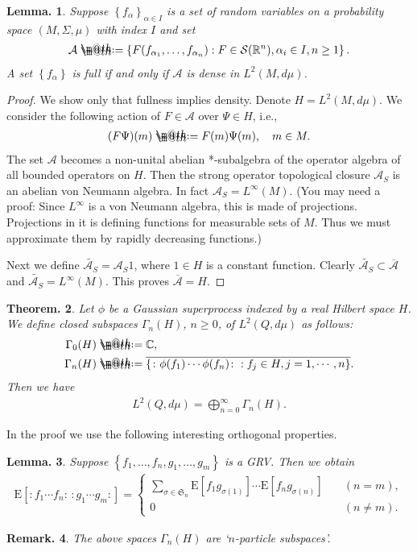 \documentclass[openany, a4paper, oneside]{book}
\makeatletter
\newcommand*{\defeq}{\mathrel{\rlap{%
\raisebox{0.3ex}{$\m@th\cdot$}}%
\raisebox{-0.3ex}{$\m@th\cdot$}}%
=}
\theoremstyle{break}
\newtheorem{thm}{Theorem.}[section]
\newtheorem{lem}[thm]{Lemma.}
\theoremstyle{breakdefn}
\newtheorem{rem}[thm]{Remark.}
\newcommand{\rbk}[1]{\left (#1\right)}
\newcommand{\sqbk}[1]{\left[#1\right]}
\newcommand{\cbk}[1]{\left\{#1\right\}}
\newcommand{\set}[2]{\left\{#1 : #2\right\}}
\newcommand{\bbC}{\mathbb{C}}
\newcommand{\bbR}{\mathbb{R}}
\newcommand{\calA}{\mathcal{A}}
\newcommand{\calS}{\mathcal{S}}
\newcommand{\E}[1]{\rmE\sqbk{#1}}
\newcommand{\rmE}{\mathrm{E}}
\makeatother
\begin{document}
\begin{lem}
 Suppose $\cbk{f_{\alpha}}_{\alpha \in I}$ is a set of random variables on a probability space $(M, \Sigma, \mu)$ with index $I$ and set
 \begin{align}
  \calA
  \defeq
  \set{F (f_{\alpha_1}, \dots, f_{\alpha_n})}{F \in \calS (\bbR^n), \alpha_i \in I, n \geq 1}.
 \end{align}
 A set $\cbk{f_{\alpha}}$ is full if and only if $\calA$ is dense in $L^2 (M, d \mu)$.
\end{lem}
\begin{proof}
 We show only that fullness implies density.
 Denote $H = L^2 (M, d \mu)$.
 We consider the following action of $F \in \calA$ over $\Psi \in H$, i.e.,
 \begin{align}
  (F \Psi) (m) \defeq F (m) \Psi (m), \quad m \in M.
 \end{align}
 The set $\calA$ becomes a non-unital abelian *-subalgebra of the operator algebra of all bounded operators on $H$.
 Then the strong operator topological closure $\calA_S$ is an abelian von Neumann algebra.
 In fact $\calA_S = L^{\infty} (M)$.
 (You may need a proof:
 Since $L^{\infty}$ is a von Neumann algebra, this is made of projections.
 Projections in it is defining functions for measurable sets of $M$.
 Thus we must approximate them by rapidly decreasing functions.)

 Next we define $\tilde{\calA_S} = \calA_S 1$, where $1 \in H$ is a constant function.
 Clearly $\tilde{\calA_S} \subset \overline{\calA}$ and $\tilde{\calA_S} = L^{\infty}(M)$.
 This proves $\overline{\calA} = H$.
\end{proof}

\begin{thm}
 Let $\phi$ be a Gaussian superprocess indexed by a real Hilbert space $H$.
 We define closed subspaces $\Gamma_n (H)$, $n \geq 0$, of $L^2 (Q, d \mu)$ as follows:
 \begin{align}
  \Gamma_0 (H)
  &\defeq \bbC, \\
  \Gamma_n (H)
  &\defeq
  \overline{\set{\colon \phi (f_1) \cdots \phi (f_n) \colon}{f_j \in H, j = 1, \cdots, n}}.
 \end{align}
 Then we have
 \begin{align}
  L^2 (Q, d \mu)
  =
  \bigoplus_{n=0}^{\infty} \Gamma_n (H).
 \end{align}
\end{thm}
In the proof we use the following interesting orthogonal properties.
\begin{lem}
 Suppose $\cbk{f_1, \dots, f_n, g_1, \dots, g_m}$ is a GRV.
 Then we obtain
 \begin{align}
  \E{\colon f_1 \cdots f_n \colon \, \colon g_1 \cdots g_m \colon}
  =
  \begin{cases}
   \sum_{\sigma \in \mathfrak{S}_n} \E{f_1 g_{\sigma \rbk{1}}} \cdots \E{f_n g_{\sigma \rbk{n}}} &\quad (n=m), \\
   0 &\quad (n \neq m).
  \end{cases}
 \end{align}
\end{lem}
\begin{rem}
 The above spaces $\Gamma_n (H)$ are `$n$-particle subspaces'.
\end{rem}
\end{document}
